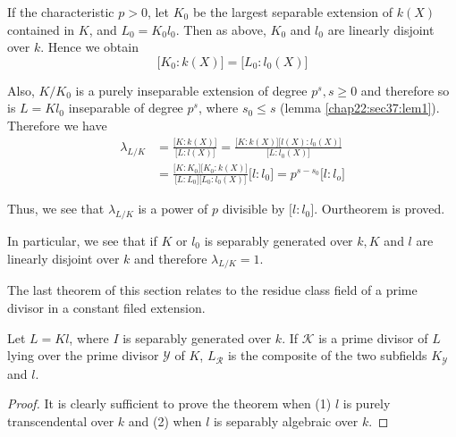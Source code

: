 If the characteristic $p > 0$, let $K_0$ be the largest separable
extension of $k (X)$ contained in $K$, and $L_0 = K_0 l_0$. Then as
above, $K_0$ and $l_0$ are linearly disjoint over $k$. Hence we obtain  
$$
\big[ K_0 : k (X) \big] = \big[L_0 : l_0 (X)\big]
$$

Also, $K/K_0$ is a purely inseparable extension of degree $p^s, s \ge
0$ and therefore so is $L =Kl_0$ inseparable of degree $p^s$, where
$s_0 \le s$ (lemma \ref{chap22:sec37:lem1}). Therefore we have  
\begin{align*}
  \lambda_{L/K} & = \frac{\big[ K: k (X)\big]} {\big[ L : l(X)\big]}
  = \frac{\big[ K : k (X)\big] \big[l(X) : l_0 (X)\big]} {\big[ L :
      l_0 (X)\big]}\\ 
  & = \frac{\big[ K : K_0\big] \big[ K_0 : k (X)\big]} {\big[ L
      :L_0\big] \big[ L_0 :l_0 (X)\big]} \big[ l : l_0\big] =
  p^{s-s_0} \big[ l: l_o\big] 
\end{align*}

Thus, we see that $\lambda_{L/K}$ is a power of $p$ divisible by
$\big[ l:l_0\big]$. Our\pageoriginale theorem is proved. 

In particular, we see that if $K$ or $l_0$ is separably
generated over $k, K$ and $l$ are linearly disjoint over $k$ and
therefore $\lambda_{L/K} = 1$.  
 
The last theorem of this section relates to the residue class field of
a prime divisor in a constant filed extension. 

\begin{theorem*}
  Let $L = Kl$, where $I$ is separably generated over $k$. If
  $\mathscr{K}$ is a prime divisor of $L$ lying over the prime divisor
  $\mathscr{Y}$ of $K$, $L_\mathscr{R}$ is the composite of the two
  subfields $K_\mathscr{Y}$ and $l$. 
\end{theorem*}

\begin{proof}
  It is clearly sufficient to prove the theorem when (1) $l$ is purely
  transcendental over $k$ and (2) when $l$ is separably algebraic
  over $k$.  
\end{proof}

